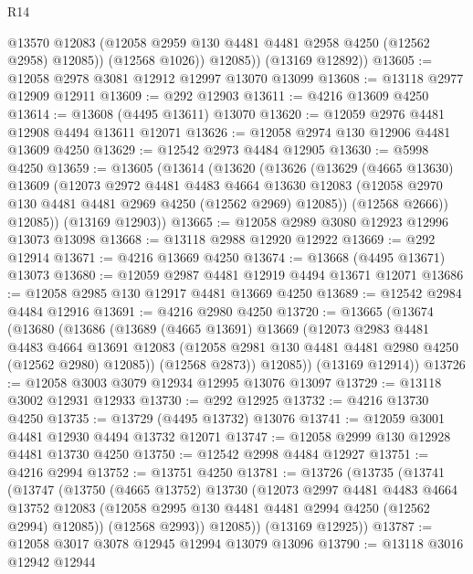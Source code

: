 \begin{lexlean}{R14}
\begin{coremodule}
              @13570
              @12083
              (@12058 @2959 @130 @4481 @4481 @2958 @4250 (@12562 @2958) @12085))
            (@12568 @1026))
          @12085))
      (@13169 @12892))
@13605 := @12058 @2978 @3081 @12912 @12997 @13070 @13099
@13608 := @13118 @2977 @12909 @12911
@13609 := @292 @12903
@13611 := @4216 @13609 @4250
@13614 := @13608 (@4495 @13611) @13070
@13620 := @12059 @2976 @4481 @12908 @4494 @13611 @12071
@13626 := @12058 @2974 @130 @12906 @4481 @13609 @4250
@13629 := @12542 @2973 @4484 @12905
@13630 := @5998 @4250
@13659 := @13605
    (@13614
      (@13620
        (@13626
          (@13629
            (@4665 @13630)
            @13609
            (@12073
              @2972
              @4481
              @4483
              @4664
              @13630
              @12083
              (@12058 @2970 @130 @4481 @4481 @2969 @4250 (@12562 @2969) @12085))
            (@12568 @2666))
          @12085))
      (@13169 @12903))
@13665 := @12058 @2989 @3080 @12923 @12996 @13073 @13098
@13668 := @13118 @2988 @12920 @12922
@13669 := @292 @12914
@13671 := @4216 @13669 @4250
@13674 := @13668 (@4495 @13671) @13073
@13680 := @12059 @2987 @4481 @12919 @4494 @13671 @12071
@13686 := @12058 @2985 @130 @12917 @4481 @13669 @4250
@13689 := @12542 @2984 @4484 @12916
@13691 := @4216 @2980 @4250
@13720 := @13665
    (@13674
      (@13680
        (@13686
          (@13689
            (@4665 @13691)
            @13669
            (@12073
              @2983
              @4481
              @4483
              @4664
              @13691
              @12083
              (@12058 @2981 @130 @4481 @4481 @2980 @4250 (@12562 @2980) @12085))
            (@12568 @2873))
          @12085))
      (@13169 @12914))
@13726 := @12058 @3003 @3079 @12934 @12995 @13076 @13097
@13729 := @13118 @3002 @12931 @12933
@13730 := @292 @12925
@13732 := @4216 @13730 @4250
@13735 := @13729 (@4495 @13732) @13076
@13741 := @12059 @3001 @4481 @12930 @4494 @13732 @12071
@13747 := @12058 @2999 @130 @12928 @4481 @13730 @4250
@13750 := @12542 @2998 @4484 @12927
@13751 := @4216 @2994
@13752 := @13751 @4250
@13781 := @13726
    (@13735
      (@13741
        (@13747
          (@13750
            (@4665 @13752)
            @13730
            (@12073
              @2997
              @4481
              @4483
              @4664
              @13752
              @12083
              (@12058 @2995 @130 @4481 @4481 @2994 @4250 (@12562 @2994) @12085))
            (@12568 @2993))
          @12085))
      (@13169 @12925))
@13787 := @12058 @3017 @3078 @12945 @12994 @13079 @13096
@13790 := @13118 @3016 @12942 @12944

\end{coremodule}
\end{lexlean}
